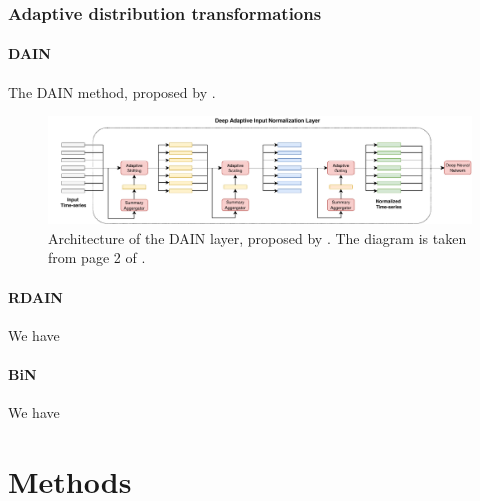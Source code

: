 \documentclass{statsmsc}
\begin{document}

\subsection{Adaptive distribution transformations}%
\label{sub:Adaptive distribution transformations}

\subsubsection{DAIN}%
\label{ssub:DAIN}

The \ac{DAIN} method, proposed by \cite{dain}.

\begin{figure}
\begin{center}
    \includegraphics[width=\textwidth]{diagrams/dain-diagram.pdf}
\end{center}
\caption{Architecture of the \acf{DAIN} layer, proposed by \citeauthor{dain}. The diagram
is taken from page 2 of \citep{dain}.}
\label{fig:dain-arch}
\end{figure}


\subsubsection{RDAIN}%
\label{ssub:RDAIN}

We have \cite{rdain}

\subsubsection{BiN}%
\label{ssub:BiN}

We have \cite{bin}




\chapter{Methods} %
\end{document}
